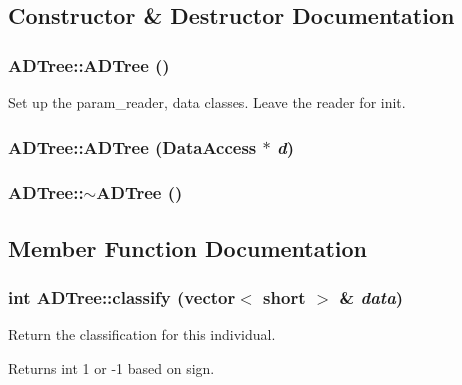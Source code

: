 \subsection{Constructor \& Destructor Documentation}
\hypertarget{classADTree_a4cc267cd53158a78c5812416b15477c6}{
\subsubsection[{ADTree}]{\setlength{\rightskip}{0pt plus 5cm}ADTree::ADTree ()}}
\label{classADTree_a4cc267cd53158a78c5812416b15477c6}
Set up the param\_\-reader, data classes. Leave the reader for init. \hypertarget{classADTree_ae5069f6f5e8fc92a8fa8f687d0c6e911}{
\subsubsection[{ADTree}]{\setlength{\rightskip}{0pt plus 5cm}ADTree::ADTree ({\bf DataAccess} $\ast$ {\em d})}}
\label{classADTree_ae5069f6f5e8fc92a8fa8f687d0c6e911}
\hypertarget{classADTree_a42f89fabb90e742c8609af4618fc5fb7}{
\subsubsection[{$\sim$ADTree}]{\setlength{\rightskip}{0pt plus 5cm}ADTree::$\sim$ADTree ()}}
\label{classADTree_a42f89fabb90e742c8609af4618fc5fb7}


\subsection{Member Function Documentation}
\hypertarget{classADTree_a266a816ec8750b5ceb1549ff610fb67b}{
\subsubsection[{classify}]{\setlength{\rightskip}{0pt plus 5cm}int ADTree::classify (vector$<$ short $>$ \& {\em data})}}
\label{classADTree_a266a816ec8750b5ceb1549ff610fb67b}
Return the classification for this individual. \begin{DoxyReturn}{Returns}
int 1 or -\/1 based on sign. 
\end{DoxyReturn}


